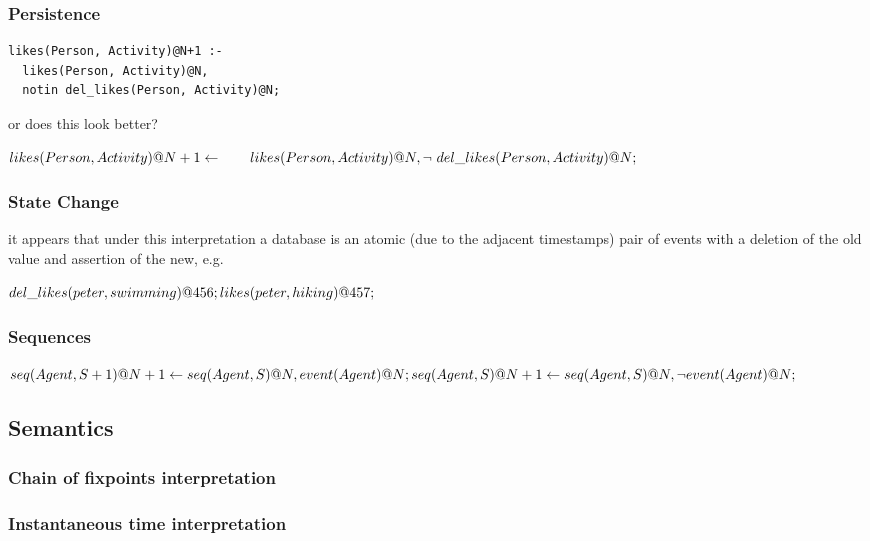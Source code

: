 \documentclass{acm_proc_article-sp-sigmod09}
\begin{document}
\subsubsection{Persistence}

\begin{verbatim}
likes(Person, Activity)@N+1 :-
  likes(Person, Activity)@N,
  notin del_likes(Person, Activity)@N;
\end{verbatim}

or does this look better?

$
likes(Person, Activity)@N+1 \leftarrow \\
  \quad \quad likes(Person, Activity)@N, \\
  \lnot~del\_likes(Person, Activity)@N;
$

\subsubsection{State Change}

it appears that under this interpretation a database is an atomic (due to the adjacent timestamps)
pair of events with a deletion of the old value and assertion of the new, e.g.

$
del\_likes(peter, swimming)@456; \\
likes(peter, hiking)@457;
$

\subsubsection{Sequences}

$
seq(Agent, S + 1)@N+1 \leftarrow \\
  seq(Agent, S)@N, \\
  event(Agent)@N; \\
  \\
seq(Agent, S)@N+1 \leftarrow \\
seq(Agent, S)@N, \\
\lnot event(Agent)@N;
$

\subsection{Semantics}
\subsubsection{Chain of fixpoints interpretation}
\subsubsection{Instantaneous time interpretation}
\end{document}
